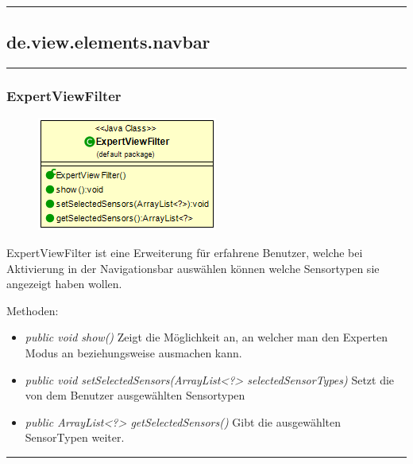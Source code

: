 \rule{\textwidth}{0.4pt}
\subsection{de.view.elements.navbar}

\rule{\textwidth}{0.4pt}
\subsubsection{ExpertViewFilter}
\begin{minipage}{0.3\textwidth}
    \begin{figure}[H]
        {\centering\includegraphics[scale = 0.55
        ]{media/view/navbar/ExpertviewFilter_Class.png}}
    \end{figure}
    \end{minipage} \hfill
    \begin{minipage}{0.6\textwidth}
ExpertViewFilter ist eine Erweiterung für erfahrene Benutzer, welche bei Aktivierung in der Navigationsbar auswählen können welche Sensortypen sie angezeigt haben wollen.
\end{minipage}
Methoden: \begin{itemize} [noitemsep]
    \item \emph{public void show()} Zeigt die Möglichkeit an, an welcher man den Experten Modus an beziehungsweise ausmachen kann.
    \item \emph{public void setSelectedSensors(ArrayList<?> selectedSensorTypes)} Setzt die von dem Benutzer ausgewählten Sensortypen
    \item \emph{public ArrayList<?> getSelectedSensors()} Gibt die ausgewählten SensorTypen weiter.
\end{itemize}

\rule{\textwidth}{0.4pt}
